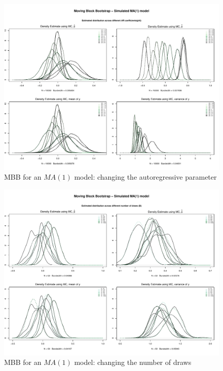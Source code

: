 \documentclass{article}
\begin{document}
\begin{figure}[hbt!]
\includegraphics[width=\textwidth]{plots/MBB_MA1_densities_diff_ARq}
\caption{MBB for an $MA(1)$ model: changing the autoregressive parameter}
\label{fig:MBB_MA1_densities_diff_ARq}
\centering
\end{figure}

\begin{figure}[hbt!]
\includegraphics[width=\textwidth]{plots/MBB_MA1_densities_diff_drawsB}
\caption{MBB for an $MA(1)$ model: changing the number of draws}
\label{fig:MBB_MA1_densities_diff_drawsB}
\centering
\end{figure}
\end{document}
